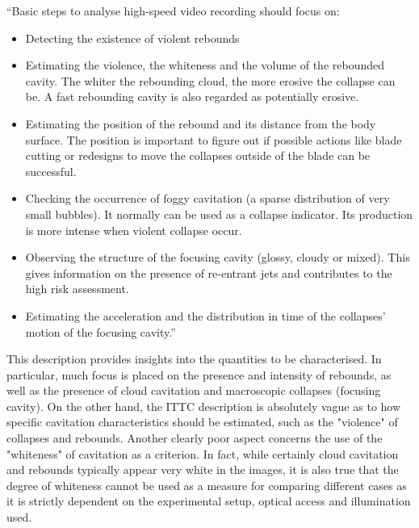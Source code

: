 “Basic steps to analyse high-speed video recording should focus on:
\begin{itemize}
    \item Detecting the existence of violent rebounds
    \item Estimating the violence, the whiteness and the volume of the rebounded cavity. The whiter the rebounding cloud, the more erosive the collapse can be. A fast rebounding cavity is also regarded as potentially erosive.
    \item Estimating the position of the rebound and its distance from the body surface. The position is important to figure out if possible actions like blade cutting or redesigns to move the collapses outside of the blade can be successful.
    \item Checking the occurrence of foggy cavitation (a sparse distribution of very small bubbles). It normally can be used as a collapse indicator. Its production is more intense when violent collapse occur.
    \item Observing the structure of the focusing cavity (glossy, cloudy or mixed). This gives information on the presence of re-entrant jets and contributes to the high risk assessment.
    \item Estimating the acceleration and the distribution in time of the collapses’ motion of the focusing cavity.”
\end{itemize}

This description provides insights into the quantities to be characterised. In particular, much focus is placed on the presence and intensity of rebounds, as well as the presence of cloud cavitation and macroscopic collapses (focusing cavity). 
On the other hand, the ITTC description is absolutely vague as to how specific cavitation characteristics should be estimated, such as the "violence" of collapses and rebounds. Another clearly poor aspect concerns the use of the "whiteness" of cavitation as a criterion. In fact, while certainly cloud cavitation and rebounds typically appear very white in the images, it is also true that the degree of whiteness cannot be used as a measure for comparing different cases as it is strictly dependent on the experimental setup, optical access and illumination used.

